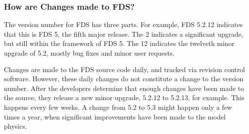 \documentclass[11pt]{book}
\begin{document}
\subsubsection{How are Changes made to FDS?}

The version number for FDS has three parts.  For example, FDS 5.2.12
indicates that this is FDS 5, the fifth major release. The 2 indicates
a significant upgrade, but still within the framework of FDS 5.  The
12 indicates the twelveth minor upgrade of 5.2, mostly bug fixes and
minor user requests.

Changes are made to the FDS source code daily, and tracked via
revision control software. However, these
daily changes do not constitute a change to the version number. After
the developers determine that enough changes have been made to the
source, they release a new minor upgrade, 5.2.12 to 5.2.13, for
example. This happens every few weeks. A change from 5.2 to 5.3 might
happen only a few times a year, when significant improvements have
been made to the model physics.
\end{document}
